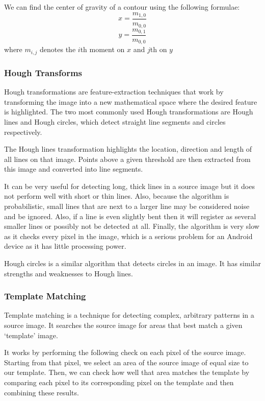 We can find the center of gravity of a contour using the following formulae:
\begin{equation}
    x = \frac{ m_{1,0}}{m_{0,0}}
\end{equation}
\begin{equation}
    y = \frac{m_{0,1}}{m_{0,0}}
\end{equation}
where $m_{i,j}$ denotes the $i$th moment on $x$ and $j$th on $y$



\subsubsection{Hough Transforms} \label{sec:hough}

Hough transformations are feature-extraction techniques that work by transforming the image into a new mathematical space where the desired feature is highlighted. The two most commonly used Hough transformations are Hough lines and Hough circles, which detect straight line segments and circles respectively.

The Hough lines transformation highlights the location, direction and length of all lines on that image. Points above a given threshold are then extracted from this image and converted into line segments.

It can be very useful for detecting long, thick lines in a source image but it does not perform well with short or thin lines. Also, because the algorithm is probabilistic, small lines that are next to a larger line may be considered noise and be ignored. Also, if a line is even slightly bent then it will register as several smaller lines or possibly not be detected at all. Finally, the algorithm is very slow as it checks every pixel in the
image, which is a serious problem for an Android device as it has little processing power.

Hough circles is a similar algorithm that detects circles in an image. It has similar strengths and weaknesses to Hough lines.

\subsubsection{Template Matching} \label{sec:template}

Template matching is a technique for detecting complex, arbitrary patterns in a source image. It searches the source image for areas that best match a given ‘template’ image.

It works by performing the following check on each pixel of the source image. Starting from that pixel, we select an area of the source image of equal size to our template. Then, we can check how well that area matches the template by comparing each pixel to its corresponding pixel on the template and then combining these results. 

